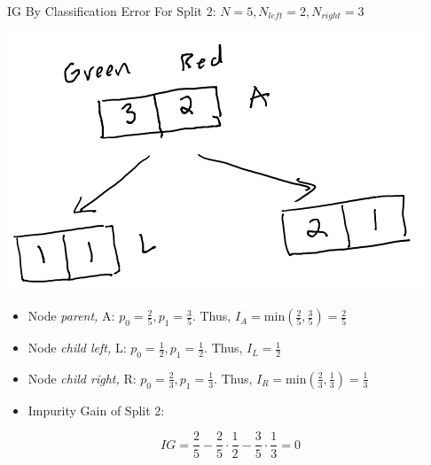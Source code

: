 \documentclass[
  ignorenonframetext,
]{beamer}
\begin{document}
\begin{frame}{IG By Classification Error}
\protect\hypertarget{ig-by-classification-error-1}{}
For Split 2: \(N = 5, N_{left} =2, N_{right} = 3\)

\includegraphics{images/im3.png}

\begin{itemize}
\item
  Node \emph{parent,} A: \(p_0 = \frac{2}{5}, p_1 = \frac{3}{5}\). Thus,
  \(I_{A} = \text{min}(\frac{2}{5}, \frac{3}{5}) = \frac{2}{5}\)
\item
  Node \emph{child left,} L: \(p_0 = \frac{1}{2}, p_1 = \frac{1}{2}\).
  Thus, \(I_{L} = \frac{1}{2}\)
\item
  Node \emph{child right,} R: \(p_0 = \frac{2}{3}, p_1 = \frac{1}{3}\).
  Thus, \(I_{R} = \text{min}(\frac{2}{3}, \frac{1}{3}) = \frac{1}{3}\)
\item
  Impurity Gain of Split 2:
\end{itemize}

\[IG = \frac{2}{5} - \frac{2}{5} \cdot \frac{1}{2}-\frac{3}{5} \cdot \frac{1}{3} = 0\]
\end{frame}
\end{document}
